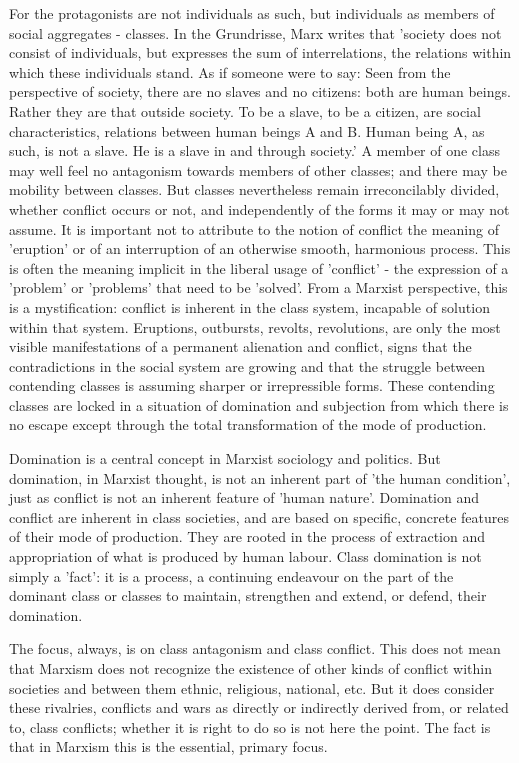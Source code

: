 For the protagonists are not individuals as such, but individuals as members of social aggregates - classes. In the Grundrisse, Marx writes that 'society does not consist of individuals, but expresses the sum of interrelations, the relations within which these individuals stand. As if someone were to say: Seen from the perspective of society, there are no slaves and no citizens: both are human beings. Rather they are that outside society. To be a slave, to be a citizen, are social characteristics, relations between human beings A and B. Human being A, as such, is not a slave. He is a slave in and through society.' A member of one class may well feel no antagonism towards members of other classes; and there may be mobility between classes. But classes nevertheless remain irreconcilably divided, whether conflict occurs or not, and independently of the forms it may or may not assume. It is important not to attribute to the notion of conflict the meaning of 'eruption' or of an interruption of an otherwise smooth, harmonious process. This is often the meaning implicit in the liberal usage of 'conflict' - the expression of a 'problem' or 'problems' that need to be 'solved'. From a Marxist perspective, this is a mystification: conflict is inherent in the class system, incapable of solution within that system. Eruptions, outbursts, revolts, revolutions, are only the most visible manifestations of a permanent alienation and conflict, signs that the contradictions in the social system are growing and that the struggle between contending classes is assuming sharper or irrepressible forms. These contending classes are locked in a situation of domination and subjection from which there is no escape except through the total transformation of the mode of production.

Domination is a central concept in Marxist sociology and politics. But domination, in Marxist thought, is not an inherent part of 'the human condition', just as conflict is not an inherent feature of 'human nature'. Domination and conflict are inherent in class societies, and are based on specific, concrete features of their mode of production. They are rooted in the process of extraction and appropriation of what is produced by human labour. Class domination is not simply a 'fact': it is a process, a continuing endeavour on the part of the dominant class or classes to maintain, strengthen and extend, or defend, their domination.

The focus, always, is on class antagonism and class conflict. This does not mean that Marxism does not recognize the existence of other kinds of conflict within societies and between them ethnic, religious, national, etc. But it does consider these rivalries, conflicts and wars as directly or indirectly derived  from, or related to, class conflicts; whether it is right to do so is not here the point. The fact is that in Marxism this is the essential, primary focus.

